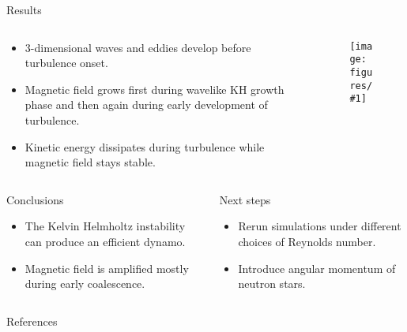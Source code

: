 \documentclass{beamer}
\newcommand{\myfig}[4]{
  \begin{figure}
    \centering
    \texttt{[image: figures/\#1]}
    \def\param{#4}
    \ifx\param\empty
    \else
      \caption{\param}
    \fi
    \label{fig:#3}
  \end{figure}
}
\begin{document}
\begin{frame}[t]
\begin{columns}
\begin{column}{0.5\textwidth}
\begin{block}{Results}
\begin{columns}[t]
\begin{column}{0.3\textwidth}
            \begin{itemize}
              \item 3-dimensional waves and eddies develop before turbulence onset.
              \item Magnetic field grows first during wavelike KH growth phase and then again during early development of turbulence.
              \item Kinetic energy dissipates during turbulence while magnetic field stays stable.
            \end{itemize}
          \end{column}
          \begin{column}{0.7\textwidth}
            \myfig{lines.pdf}{1.0}{lines}{}
          \end{column}
        \end{columns}
      \end{block}
        \begin{columns}[t]
        \begin{column}{0.5\textwidth}
      \begin{block}{Conclusions}
        \begin{itemize}
          \item The Kelvin Helmholtz instability can produce an efficient dynamo.
          \item Magnetic field is amplified mostly during early coalescence.
        \end{itemize}
      \end{block}
      \end{column}
          \begin{column}{0.5\textwidth}
            \begin{block}{Next steps}
        \begin{itemize}
          \item Rerun simulations under different choices of Reynolds number.
          \item Introduce angular momentum of neutron stars.
        \end{itemize}
      \end{block}
      \end{column}
    \end{columns}
    \end{column}
  \end{columns}
  \begin{block}{References}
    \nocite{burns2020a}
    
    
  \end{block}
\end{frame}
\end{document}
